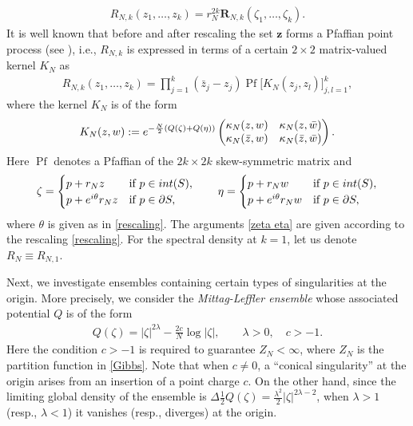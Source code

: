 \documentclass[11pt]{article}
\numberwithin{equation}{section}
\numberwithin{equation}{section}
\newcommand{\bfR}{\mathbf{R}}
\newcommand{\1}{\chi}
\newcommand{\Pf}{{\operatorname{Pf}}}
\begin{document}
\begin{gather*}
R_{N,k}(z_1,\dots, z_k)=r_N^{2k} \bfR_{N,k}(\zeta_1,\dots,\zeta_k).
\end{gather*}
It is well known that before and after rescaling the
set $\boldsymbol{z}$ forms a Pfaffian point process (see \cite{MR1928853,Mehta}), i.e., $R_{N,k}$ is expressed in terms of a certain $2\times 2$ matrix-valued kernel $K_N$ as
\begin{gather} \label{RNk Pf}
	R_{N,k}(z_1,\dots, z_k)=\prod_{j=1}^{k}
(\bar{z}_j-z_j) \Pf \big[ K_{N}(z_j,z_l) \big]_{ j,l=1 }^k ,
\end{gather}
where the kernel $K_N$ is of the form
\begin{gather*}
	K_N(z,w):={\rm e}^{ -\frac{N}{2} (Q( \zeta )+Q( \eta )) } \begin{pmatrix}
		\kappa_N(z,w) & \kappa_N(z,\bar{w}) \\
		\kappa_N(\bar{z},w) & \kappa_N(\bar{z},\bar{w})
	\end{pmatrix}.
\end{gather*}
Here $\Pf$ denotes a Pfaffian of the $2k \times 2k$ skew-symmetric matrix and
\begin{gather} \label{zeta eta}
\zeta=\begin{cases}
	p+r_N z &\text{if }p \in \textup{int}(S),
	\\
	p+{\rm e}^{{\rm i}\theta} r_N z &\text{if }p \in \partial S,
\end{cases} \qquad
 \eta=\begin{cases}
	 p+r_N w &\text{if }p \in \textup{int}(S),
	\\
	 p+{\rm e}^{{\rm i}\theta} r_N w &\text{if }p \in \partial S,
\end{cases}
\end{gather}
where $\theta$ is given as in \eqref{rescaling}.
The arguments \eqref{zeta eta} are given according to the rescaling \eqref{rescaling}.
For the spectral density at $k=1$, let us denote $R_N \equiv R_{N,1}$.


\setcounter{section}{2}\setcounter{Theorem}{3}\setcounter{equation}{11}
Next, we investigate ensembles containing certain types of singularities at the origin. More precisely, we consider the \textit{Mittag-Leffler ensemble} whose associated potential $Q$ is of the form
\begin{gather} \label{Q ML}
	Q(\zeta)=|\zeta|^{2\lambda}-\frac{2c}{N} \log|\zeta|, \qquad \lambda>0, \quad c>-1.
\end{gather}
Here the condition $c>-1$ is required to guarantee $Z_N < \infty$, where $Z_N$ is the partition function in \eqref{Gibbs}. Note that when $c \not=0$, a ``conical singularity'' at the origin arises from an insertion of a point charge $c$.
On the other hand, since the limiting global density of the ensemble is $\Delta \tfrac12 Q(\zeta)=\tfrac{\lambda^2}2 |\zeta|^{2\lambda-2}$, when $\lambda>1$ (resp., $\lambda<1$) it vanishes (resp., diverges) at the origin.
\end{document}
